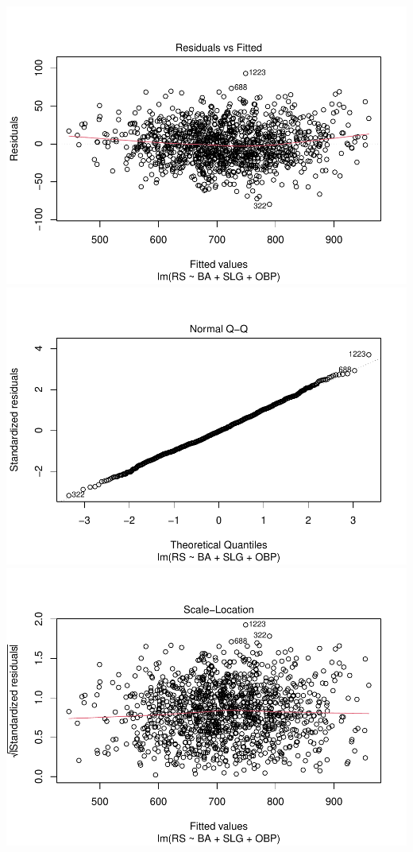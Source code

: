 \documentclass[
]{article}
\begin{document}
\includegraphics{HW2_Liu-Zi-Jian_files/figure-latex/unnamed-chunk-39-1.pdf}
\includegraphics{HW2_Liu-Zi-Jian_files/figure-latex/unnamed-chunk-39-2.pdf}
\includegraphics{HW2_Liu-Zi-Jian_files/figure-latex/unnamed-chunk-39-3.pdf}
\end{document}

